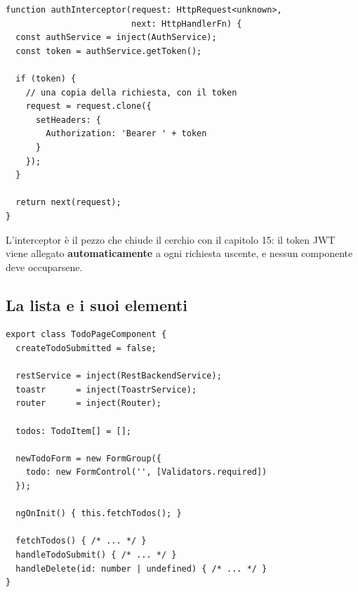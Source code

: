 \begin{affianco}[0.5][c]
\codicepiccolo
\begin{lstlisting}[style=ts, name=auth.interceptor.ts]
function authInterceptor(request: HttpRequest<unknown>,
                         next: HttpHandlerFn) {
  const authService = inject(AuthService);
  const token = authService.getToken();

  if (token) {
    // una copia della richiesta, con il token
    request = request.clone({
      setHeaders: {
        Authorization: 'Bearer ' + token
      }
    });
  }

  return next(request);
}
\end{lstlisting}
\risultato
\begin{immagine}
\end{immagine}
\end{affianco}

L'interceptor è il pezzo che chiude il cerchio con il capitolo 15: il token JWT
viene allegato \textbf{automaticamente} a ogni richiesta uscente, e nessun
componente deve occuparsene.

\subsection{La lista e i suoi elementi}

\begin{lstlisting}[style=ts, name=todo-page.component.ts]
export class TodoPageComponent {
  createTodoSubmitted = false;

  restService = inject(RestBackendService);
  toastr      = inject(ToastrService);
  router      = inject(Router);

  todos: TodoItem[] = [];

  newTodoForm = new FormGroup({
    todo: new FormControl('', [Validators.required])
  });

  ngOnInit() { this.fetchTodos(); }

  fetchTodos() { /* ... */ }
  handleTodoSubmit() { /* ... */ }
  handleDelete(id: number | undefined) { /* ... */ }
}
\end{lstlisting}

